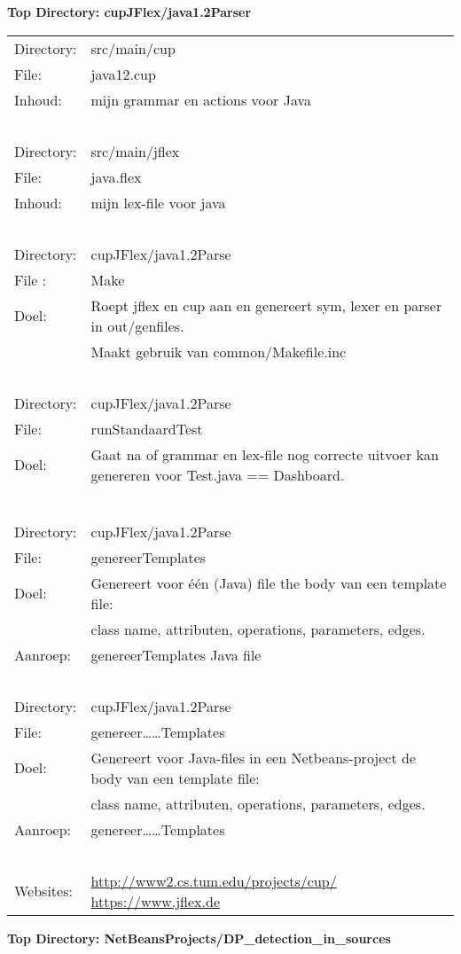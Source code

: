 \documentclass[12pt,a4paper]{report}
\begin{document}
	\begin{center}
		\textbf{Top Directory: cupJFlex/java1.2Parser}
	\end{center}

\begin{flushleft}
\begin{tabular} {l p{12cm}}
Directory: & src/main/cup \\
File:      & java12.cup \\   
Inhoud:    & mijn grammar en actions voor Java \\
\ \\
Directory: & src/main/jflex  \\
File:      & java.flex  \\  
Inhoud:    & mijn lex-file voor java \\
\ \\
Directory: & cupJFlex/java1.2Parse \\
File :     & Make \\
Doel:      & Roept jflex en cup aan en genereert sym, lexer en parser in out/genfiles. \\
           & Maakt gebruik van common/Makefile.inc \\
\ \\
Directory: & cupJFlex/java1.2Parse \\
File:      & runStandaardTest  \\  
Doel:      & Gaat na of grammar en lex-file nog correcte uitvoer kan genereren voor 
             Test.java == Dashboard. \\
           & \\
\ \\
Directory: & cupJFlex/java1.2Parse \\
File:      & genereerTemplates  \\  
Doel:      & Genereert voor \'e\'en (Java) file the body van een template file: \\
		   & class name, attributen, operations, parameters, edges. \\
Aanroep:   & genereerTemplates Java file \\
\ \\
Directory: & cupJFlex/java1.2Parse \\
File:      & genereer\dots\dots Templates  \\  
Doel:      & Genereert voor Java-files in een Netbeans-project 
             de body van een template file: \\
           & class name, attributen, operations, parameters, edges. \\
Aanroep:   & genereer\dots\dots Templates \\
\ \\
Websites:  & \url{http://www2.cs.tum.edu/projects/cup/}  \newline
\url{https://www.jflex.de} \\
\end{tabular}
\end{flushleft}
\pagebreak
\begin{center}
	\textbf{Top Directory: NetBeansProjects/DP\_detection\_in\_sources}
\end{center}
\end{document}
